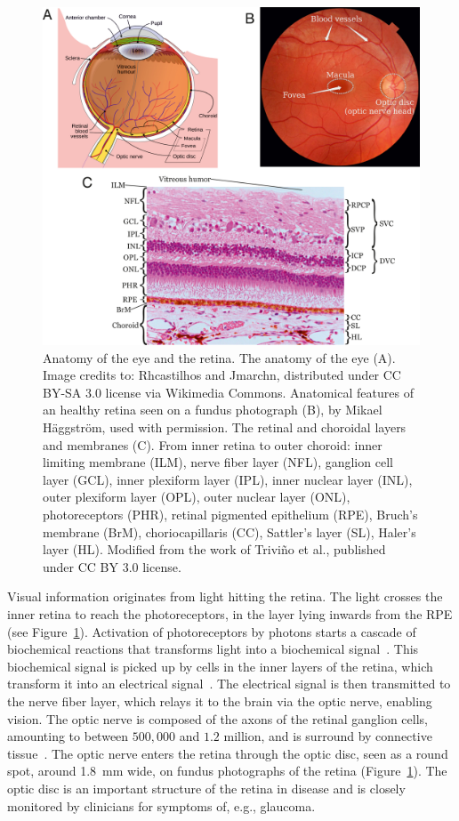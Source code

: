 \documentclass{article}
\begin{document}
\begin{figure}[t!]
  \centering
  \includegraphics[width=\textwidth]{Figure1}
  \caption{Anatomy of the eye and the retina. The anatomy of the eye (A). Image credits to: Rhcastilhos and Jmarchn, distributed under CC BY-SA 3.0 license via Wikimedia Commons. Anatomical features of an healthy retina seen on a fundus photograph (B), by Mikael H\"aggstr\"om, used with permission. The retinal and choroidal layers and membranes (C). From inner retina to outer choroid: inner limiting membrane (ILM), nerve fiber layer (NFL), ganglion cell layer (GCL), inner plexiform layer (IPL), inner nuclear layer (INL), outer plexiform layer (OPL), outer nuclear layer (ONL), photoreceptors (PHR), retinal pigmented epithelium (RPE), Bruch's membrane (BrM), choriocapillaris (CC), Sattler's layer (SL), Haler's layer (HL). Modified from the work of Trivi\~no et al., published under CC BY 3.0 license.~\cite{Trivino_2012}}
  \label{fig:architecture-eye}
\end{figure}


Visual information originates from light hitting the retina.
The light crosses the inner retina to reach the photoreceptors, in the layer lying inwards from the RPE (see Figure~\ref{fig:architecture-eye}).
Activation of photoreceptors by photons starts a cascade of biochemical reactions that transforms light into a biochemical signal~\cite{Hurley_2009}.
This biochemical signal is picked up by cells in the inner layers of the retina, which transform it into an electrical signal~\cite{Arslan_2018}.
The electrical signal is then transmitted to the nerve fiber layer, which relays it to the brain via the optic nerve, enabling vision.
The optic nerve is composed of the axons of the retinal ganglion cells, amounting to between $500,000$ and $1.2$ million, and is surround by connective tissue~\cite{Salazar_2019}.
The optic nerve enters the retina through the optic disc, seen as a round spot, around \SI{1.8}{\mm} wide, on fundus photographs of the retina (Figure~\ref{fig:architecture-eye}).
The optic disc is an important structure of the retina in disease and is closely monitored by clinicians for symptoms of, e.g., glaucoma.
\end{document}
